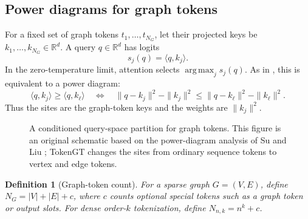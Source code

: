 \documentclass[11pt]{article}
\newtheorem{definition}[theorem]{Definition}
\DeclareMathOperator{\argmax}{arg\,max}
\newcommand{\R}{\mathbb{R}}
\begin{document}
\subsection{Power diagrams for graph tokens}

For a fixed set of graph tokens $t_1,\dots,t_{N_G}$, let their projected keys be $k_1,\dots,k_{N_G}\in \R^d$.  A query $q\in \R^d$ has logits
\[
  s_j(q)=\langle q,k_j\rangle .
\]
In the zero-temperature limit, attention selects $\argmax_j s_j(q)$.  As in \cite{su2026tropicalexpressivity}, this is equivalent to a power diagram:
\[
  \langle q,k_j\rangle \ge \langle q,k_\ell\rangle
  \quad\Longleftrightarrow\quad
  \|q-k_j\|^2-\|k_j\|^2
  \le
  \|q-k_\ell\|^2-\|k_\ell\|^2.
\]
Thus the sites are the graph-token keys and the weights are $\|k_j\|^2$.

\begin{figure}[t]
\centering
{}
\caption{A conditioned query-space partition for graph tokens.  This figure is an original schematic based on the power-diagram analysis of Su and Liu \cite{su2026tropicalexpressivity}; TokenGT changes the sites from ordinary sequence tokens to vertex and edge tokens.}
\label{fig:power}
\end{figure}

\begin{definition}[Graph-token count]
For a sparse graph $G=(V,E)$, define $N_G=|V|+|E|+c$, where $c$ counts optional special tokens such as a graph token or output slots.  For dense order-$k$ tokenization, define $N_{n,k}=n^k+c$.
\end{definition}
\end{document}
